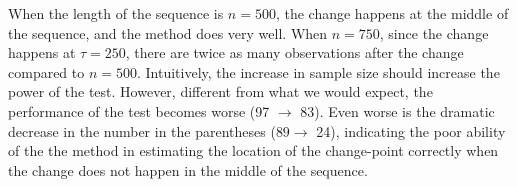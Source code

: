\documentclass[arxiv, preprint]{imsart}
\numberwithin{equation}{section}
\theoremstyle{plain}
\begin{document}
When the length of the sequence is $n=500$, the change happens at the middle of the sequence, and the method does very well.  When $n=750$, since the change happens at $\tau=250$, there are twice as many observations after the change compared to $n=500$.  Intuitively, the increase in sample size should increase the power of the test.  However, different from what we would expect, the performance of the test becomes worse (97 $\rightarrow$ 83).  Even worse is the dramatic decrease in the number in the parentheses ($89\rightarrow$ 24), indicating the poor ability of the the method in estimating the location  of the change-point correctly when the change does not happen in the middle of the sequence.

%
%


\end{document}
